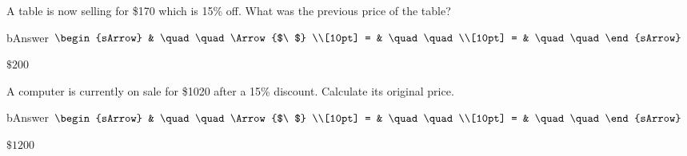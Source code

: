 \begin{mtask}[resume]
  \task A table is now selling for \$170 which is 15\% off. What was the previous price of the table?
      \begin{envOut}[height=6cm]{bAnswer}
	       $\begin{sArrow}
	             & \quad\quad       \Arrow{$\ $} \\[10pt]
               = & \quad\quad               \\[10pt]      
			   = & \quad\quad  
	        \end{sArrow}$
      \end{envOut}
	  \begin{shortsolution}  
	     $\$200$
 	  \end{shortsolution}

  \task A computer is currently on sale for \$1020 after a 15\% discount. Calculate its original price.
      \begin{envOut}[height=6cm]{bAnswer}
	       $\begin{sArrow}
	             & \quad\quad       \Arrow{$\ $} \\[10pt]
               = & \quad\quad               \\[10pt]      
			   = & \quad\quad  
	        \end{sArrow}$
      \end{envOut}
	  \begin{shortsolution}  
	     $\$1200$
 	  \end{shortsolution}	  
\end{mtask}

